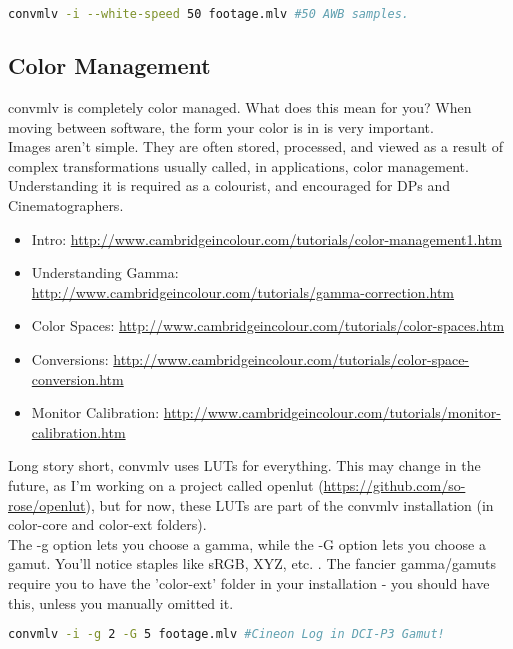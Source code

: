 \documentclass[a4paper,12pt]{article}
\begin{document}
\begin{lstlisting}[language=bash]
	convmlv -i --white-speed 50 footage.mlv #50 AWB samples.
\end{lstlisting}

	\subsection{Color Management}
		convmlv is completely color managed. What does this mean for you? When moving between software, the form your color is in is very important.\\
		
		Images aren't simple. They are often stored, processed, and viewed as a result of complex transformations usually called, 
        in applications, color management. Understanding it is required as a colourist, and encouraged for DPs and Cinematographers.
		
		\begin{itemize}
			\item Intro: \url{http://www.cambridgeincolour.com/tutorials/color-management1.htm}
			\item Understanding Gamma: \url{http://www.cambridgeincolour.com/tutorials/gamma-correction.htm}
			\item Color Spaces: \url{http://www.cambridgeincolour.com/tutorials/color-spaces.htm}
			\item Conversions: \url{http://www.cambridgeincolour.com/tutorials/color-space-conversion.htm}
			\item Monitor Calibration: \url{http://www.cambridgeincolour.com/tutorials/monitor-calibration.htm}
		\end{itemize}
		
		Long story short, convmlv uses LUTs for everything. This may change in the future, as I'm working on a project called
		openlut (\url{https://github.com/so-rose/openlut}), but for now, these LUTs are part of the convmlv installation (in color-core and color-ext folders).\\
		
		The -g option lets you choose a gamma, while the -G option lets you choose a gamut. You'll notice staples like sRGB, XYZ, etc. .
		The fancier gamma/gamuts require you to have the 'color-ext' folder in your installation - you should have this, unless you manually omitted it.
		
\begin{lstlisting}[language=bash]
	convmlv -i -g 2 -G 5 footage.mlv #Cineon Log in DCI-P3 Gamut!
\end{lstlisting}
\end{document}
